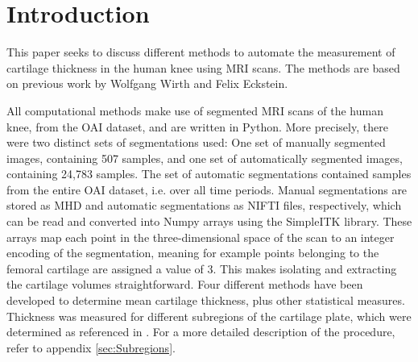 \section{Introduction}
\label{sec:Introduction}
This paper seeks to discuss different methods to automate the measurement of cartilage thickness in the human knee using MRI scans. The methods are based on previous work by Wolfgang Wirth and Felix Eckstein. \cite{wirth2008technique}
\par\noindent
All computational methods make use of segmented MRI scans of the human knee, from the OAI dataset, and are written in Python. More precisely, there were two distinct sets of segmentations used: One set of manually segmented images, containing 507 samples, and one set of automatically segmented images, containing 24,783 samples. The set of automatic segmentations contained samples from the entire OAI dataset, i.e. over all time periods. Manual segmentations are stored as MHD and automatic segmentations as NIFTI files, respectively, which can be read and converted into Numpy arrays using the SimpleITK library. These arrays map each point in the three-dimensional space of the scan to an integer encoding of the segmentation, meaning for example points belonging to the femoral cartilage are assigned a value of 3. This makes isolating and extracting the cartilage volumes straightforward. Four different methods have been developed to determine mean cartilage thickness, plus other statistical measures. Thickness was measured for different subregions of the cartilage plate, which were determined as referenced in \cite{wirth2008technique}. For a more detailed description of the procedure, refer to appendix \ref{sec:Subregions}. 

